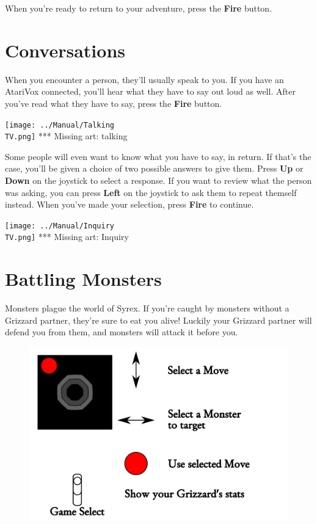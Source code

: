 \documentclass[10pt,twocolumn,openany,article]{memoir}
\newcommand\TV{NTSC}
\newcommand\TV{PAL}
\newcommand\TV{SECAM}
\begin{document}
When you're ready to return to your adventure, press the \textbf{Fire} button.

\section{Conversations}

When you encounter  a person, they'll usually speak to  you. If you have
an AtariVox  connected, you'll hear  what they have  to say out  loud as
well.   After  you've   read  what   they   have  to   say,  press   the
\textbf{Fire} button.

\begin{center}
  \texttt{[image: ../Manual/Talking\\TV.png]}
  *** Missing art: talking
\end{center}

Some people  will even  want to know  what you have  to say,  in return.
If that's the case, you'll be given  a choice of two possible answers to
give them. Press \textbf{Up} or  \textbf{Down} on the joystick to select
a response. If  you want to review  what the person was  asking, you can
press   \textbf{Left}  on   the   joystick  to   ask   them  to   repeat
themself instead.  When you've made your  selection, press \textbf{Fire}
to continue.

\begin{center}
  \texttt{[image: ../Manual/Inquiry\\TV.png]}
  *** Missing art: Inquiry
\end{center}


\section{Battling Monsters}

Monsters plague the world of Syrex. If you're caught by monsters without
a Grizzard partner, they're sure to eat you alive! Luckily your Grizzard
partner  will  defend  you  from  them,  and  monsters  will  attack  it
before you.

\begin{figure}[ht]
  \includegraphics[width=2\columnwidth]{../Manual/CombatControls.png}
\end{figure}
\end{document}

